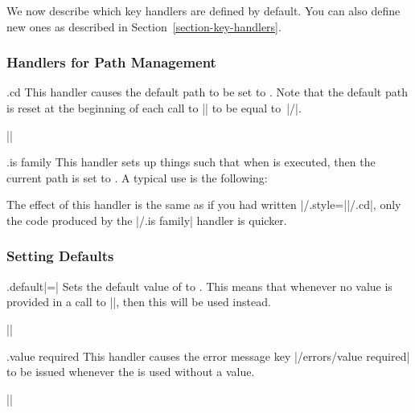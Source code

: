 We now describe which key handlers are defined by default. You can also define
new ones as described in Section~\ref{section-key-handlers}.


\subsubsection{Handlers for Path Management}

\begin{handler}{{.cd}}
    This handler causes the default path to be set to . Note that the
    default path is reset at the beginning of each call to |\pgfkeys| to be
    equal to~|/|.

    \example ||
\end{handler}

\begin{handler}{{.is family}}
\label{section-is family-handler}
    This handler sets up things such that when  is executed, then the
    current path is set to . A typical use is the following:
\begin{codeexample}
\end{codeexample}
    The effect of this handler is the same as if you had written
    |/.style=||/.cd|, only the code produced by the
    |/.is family| handler is quicker.
\end{handler}


\subsubsection{Setting Defaults}
\label{section-default-handlers}

\begin{handler}{{.default}|=|}
    Sets the default value of  to . This means that
    whenever no value is provided in a call to |\pgfkeys|, then this
     will be used instead.

    \example ||
\end{handler}

\begin{handler}{{.value required}}
    This handler causes the error message key |/errors/value required| to be
    issued whenever the  is used without a value.

    \example ||
\end{handler}


